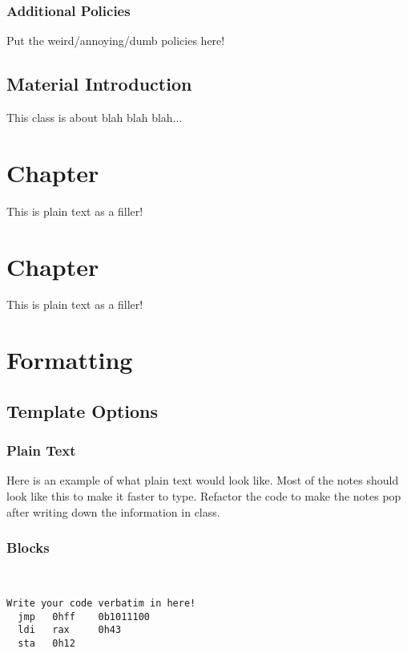 \documentclass[11pt,fleqn,openany]{book} %
\begin{document}
\subsection{Additional Policies}
Put the weird/annoying/dumb policies here!

\section{Material Introduction}
This class is about blah blah blah...

\chapter{Chapter}

This is plain text as a filler!

\chapter{Chapter}

This is plain text as a filler!

\chapter{Formatting}
\section{Template Options}
\subsection{Plain Text}
Here is an example of what plain text would look like. Most of the notes should look like this to make it faster to type. Refactor the code to make the notes pop after writing down the information in class.
\subsection{Blocks}

\begin{code}~\\
\begin{verbatim}
Write your code verbatim in here!
  jmp   0hff    0b1011100   
  ldi   rax     0h43 
  sta   0h12  
\end{verbatim}
\end{code}
\end{document}
